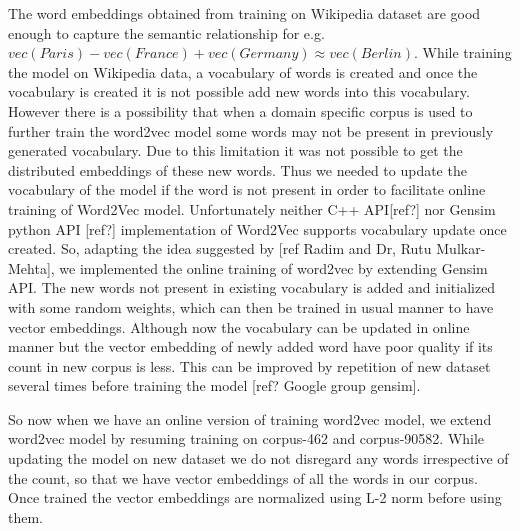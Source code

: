 The word embeddings obtained from training on Wikipedia dataset are good enough to capture the semantic relationship for e.g. $vec(Paris) -vec(France) + vec(Germany) \approx vec(Berlin)$. While training the model on Wikipedia data, a vocabulary of words is created and once the vocabulary is created it is not possible add new words into this vocabulary. However there is a possibility that when a domain specific corpus is used to further train the word2vec model some words may not be present in previously generated vocabulary. Due to this limitation it was not possible to get the distributed embeddings of these new words. Thus we needed to update the vocabulary of the model if the word is not present in order to facilitate online training of Word2Vec model. Unfortunately neither C++ API[ref?] nor Gensim python API [ref?] implementation of Word2Vec supports vocabulary update once created. So, adapting the idea suggested by [ref Radim and Dr, Rutu Mulkar-Mehta], we implemented the online training of word2vec by extending Gensim API. The new words not present in existing vocabulary is added and initialized with some random weights, which can then be trained in usual manner to have vector embeddings. Although now the vocabulary can be updated in online manner but the vector embedding of newly added word have poor quality if its count in new corpus is less. This can be improved by repetition of new dataset several times before training the model [ref? Google group gensim].

So now when we have an online version of training word2vec model, we extend word2vec model by resuming training on corpus-462 and corpus-90582. While updating the model on new dataset we do not disregard any words irrespective of the count, so that we have vector embeddings of all the words in our corpus. Once trained the vector embeddings are normalized using L-2 norm before using them. 

